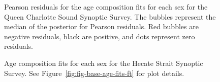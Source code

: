 \documentclass[11pt]{book}
\begin{document}
\begin{figure}[H]

{\centering {} 

}

\caption{Pearson residuals for the age composition fits for each sex for the Queen Charlotte Sound Synoptic Survey. The bubbles represent the median of the posterior for Pearson residuals. Red bubbles are negative residuals, black are positive, and dots represent zero residuals.}\label{fig:fig-base-age-resids-qcs}
\end{figure}
\clearpage




\begin{figure}[H]

{\centering {} 

}

\caption{Age composition fits for each sex for the Hecate Strait Synoptic Survey. See Figure~\ref{fig:fig-base-age-fits-ft} for plot details.}\label{fig:fig-base-age-fits-hss}
\end{figure}
\end{document}
